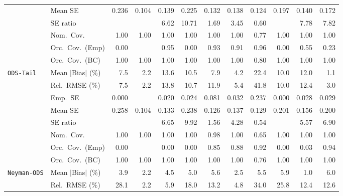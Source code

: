 \begin{landscape}
\begin{longtable}{llrrrrrrrrrr}
 & Mean SE & 0.236 & 0.104 & 0.139 & 0.225 & 0.132 & 0.138 & 0.124 & 0.197 & 0.140 & 0.172 \\
 & SE ratio &  &  & 6.62 & 10.71 & \cellcolor{ranktwo}1.69 & \cellcolor{rankthree}3.45 & \cellcolor{rankone}0.60 &  & 7.78 & 7.82 \\
 & Nom.\ Cov. & \cellcolor{rankone}1.00 & \cellcolor{ranktwo}1.00 & \cellcolor{rankthree}1.00 & 1.00 & 1.00 & 1.00 & 0.77 & 1.00 & 1.00 & 1.00 \\
 & Orc.\ Cov.\ (Emp) & 0.00 &  & \cellcolor{rankone}0.95 & 0.00 & \cellcolor{rankthree}0.93 & 0.91 & \cellcolor{ranktwo}0.96 & 0.00 & 0.55 & 0.23 \\
 & Orc.\ Cov.\ (BC) & \cellcolor{rankone}1.00 & \cellcolor{ranktwo}1.00 & \cellcolor{rankthree}1.00 & 1.00 & 1.00 & 1.00 & 0.80 & 1.00 & 1.00 & 1.00 \\
\addlinespace[2pt]
\quad \texttt{ODS-Tail} & Mean $|$Bias$|$ (\%) & 7.5 & \cellcolor{ranktwo}2.2 & 13.6 & 10.5 & 7.9 & \cellcolor{rankthree}4.2 & 22.4 & 10.0 & 12.0 & \cellcolor{rankone}1.1 \\
 & Rel.\ RMSE (\%) & 7.5 & \cellcolor{rankone}2.2 & 13.8 & 10.7 & 11.9 & \cellcolor{rankthree}5.4 & 41.8 & 10.0 & 12.4 & \cellcolor{ranktwo}3.0 \\
 & Emp.\ SE & 0.000 &  & 0.020 & 0.024 & 0.081 & 0.032 & 0.237 & 0.000 & 0.028 & 0.029 \\
 & Mean SE & 0.258 & 0.104 & 0.133 & 0.238 & 0.126 & 0.137 & 0.129 & 0.201 & 0.156 & 0.200 \\
 & SE ratio &  &  & 6.65 & 9.92 & \cellcolor{ranktwo}1.56 & \cellcolor{rankthree}4.28 & \cellcolor{rankone}0.54 &  & 5.57 & 6.90 \\
 & Nom.\ Cov. & \cellcolor{ranktwo}1.00 & \cellcolor{rankthree}1.00 & 1.00 & 1.00 & \cellcolor{rankone}0.98 & 1.00 & 0.65 & 1.00 & 1.00 & 1.00 \\
 & Orc.\ Cov.\ (Emp) & 0.00 &  & 0.00 & 0.00 & 0.85 & \cellcolor{rankthree}0.88 & \cellcolor{ranktwo}0.92 & 0.00 & 0.03 & \cellcolor{rankone}0.94 \\
 & Orc.\ Cov.\ (BC) & \cellcolor{ranktwo}1.00 & \cellcolor{rankthree}1.00 & 1.00 & 1.00 & \cellcolor{rankone}1.00 & 1.00 & 0.76 & 1.00 & 1.00 & 1.00 \\
\addlinespace[2pt]
\quad \texttt{Neyman-ODS} & Mean $|$Bias$|$ (\%) & 3.9 & \cellcolor{ranktwo}2.2 & 4.5 & 5.0 & 5.6 & \cellcolor{rankthree}2.5 & 5.5 & 5.9 & \cellcolor{rankone}1.0 & 6.0 \\
 & Rel.\ RMSE (\%) & 28.1 & \cellcolor{rankone}2.2 & \cellcolor{rankthree}5.9 & 18.0 & 13.2 & \cellcolor{ranktwo}4.8 & 34.0 & 25.8 & 12.4 & 12.6 \\

\end{longtable}
\end{landscape}
